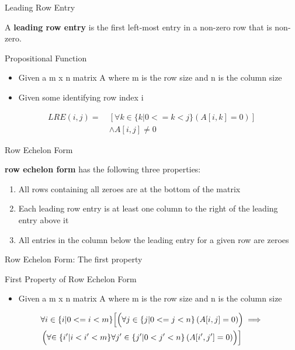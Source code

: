 \documentclass{beamer}
\begin{document}
\begin{frame}{Leading Row Entry}
\begin{definition}
A \textbf{leading row entry} is the first left-most entry in a non-zero row that is non-zero.
\end{definition}
\begin{block}{Propositional Function}
\begin{itemize}
\item Given a m x n matrix A where m is the row size and n is the column size
\item Given some identifying row index i
\end{itemize}
\begin{equation}
\begin{split}
LRE(i, j) = \ &\left[\forall k \in \{ k | 0 <= k < j \}\left(A\left[i, k\right] = 0\right)\right] \\
            \ &\land A\left[i, j\right] \neq 0
\end{split}
\end{equation}
\end{block}
\end{frame}

\begin{frame}{Row Echelon Form}
\begin{definition}
\textbf{row echelon form} has the following three properties:
\begin{enumerate}
\item All rows containing all zeroes are at the bottom of the matrix
\item Each leading row entry is at least one column to the right of the leading entry above it
\item All entries in the column below the leading entry for a given row are zeroes
\end{enumerate}
\end{definition}
\end{frame}


\begin{frame}{Row Echelon Form: The first property}
\begin{block}{First Property of Row Echelon Form}
\begin{itemize}
\item Given a m x n matrix A where m is the row size and n is the column size
\end{itemize}
\begin{equation}
\begin{split}
&\forall i \in \{i | 0 <= i < m\}\Bigl[\Bigl(\forall j \in \{j | 0 <= j < n \}\left( A[i, j] = 0\right)\Bigr) \implies \Bigr. \\ 
&\left(\forall \Bigl. \in \{i^{\prime} | i < i^{\prime} < m\} \forall j^{\prime} \in \{ j^{\prime} | 0 < j^{\prime} < n \} \left(A[i^{\prime}, j^{\prime}] = 0\right) \right) \Bigr]
\end{split}
\end{equation}
\end{block}
\end{frame}
\end{document}
